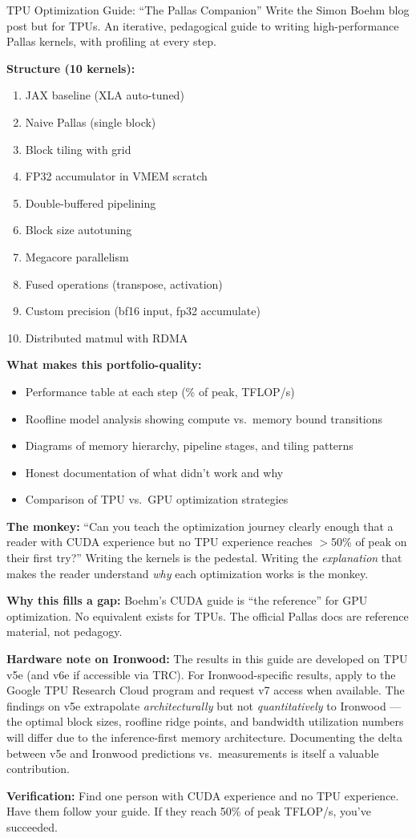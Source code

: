 \begin{portfolio}{TPU Optimization Guide: ``The Pallas Companion''}
Write the Simon Boehm blog post but for TPUs. An iterative, pedagogical guide to writing high-performance Pallas kernels, with profiling at every step.

\textbf{Structure (10 kernels):}
\begin{enumerate}
  \item JAX baseline (XLA auto-tuned)
  \item Naive Pallas (single block)
  \item Block tiling with grid
  \item FP32 accumulator in VMEM scratch
  \item Double-buffered pipelining
  \item Block size autotuning
  \item Megacore parallelism
  \item Fused operations (transpose, activation)
  \item Custom precision (bf16 input, fp32 accumulate)
  \item Distributed matmul with RDMA
\end{enumerate}

\textbf{What makes this portfolio-quality:}
\begin{itemize}
  \item Performance table at each step (\% of peak, TFLOP/s)
  \item Roofline model analysis showing compute vs.\ memory bound transitions
  \item Diagrams of memory hierarchy, pipeline stages, and tiling patterns
  \item Honest documentation of what didn't work and why
  \item Comparison of TPU vs.\ GPU optimization strategies
\end{itemize}

\textbf{The monkey:} ``Can you teach the optimization journey clearly enough that a reader with CUDA experience but no TPU experience reaches $>$50\% of peak on their first try?'' Writing the kernels is the pedestal. Writing the \textit{explanation} that makes the reader understand \textit{why} each optimization works is the monkey.

\textbf{Why this fills a gap:} Boehm's CUDA guide is ``the reference'' for GPU optimization. No equivalent exists for TPUs. The official Pallas docs are reference material, not pedagogy.

\textbf{Hardware note on Ironwood:} The results in this guide are developed on TPU v5e (and v6e if accessible via TRC). For Ironwood-specific results, apply to the Google TPU Research Cloud program and request v7 access when available. The findings on v5e extrapolate \textit{architecturally} but not \textit{quantitatively} to Ironwood --- the optimal block sizes, roofline ridge points, and bandwidth utilization numbers will differ due to the inference-first memory architecture. Documenting the delta between v5e and Ironwood predictions vs.\ measurements is itself a valuable contribution.

\textbf{Verification:} Find one person with CUDA experience and no TPU experience. Have them follow your guide. If they reach 50\% of peak TFLOP/s, you've succeeded.
\end{portfolio}

\newpage
